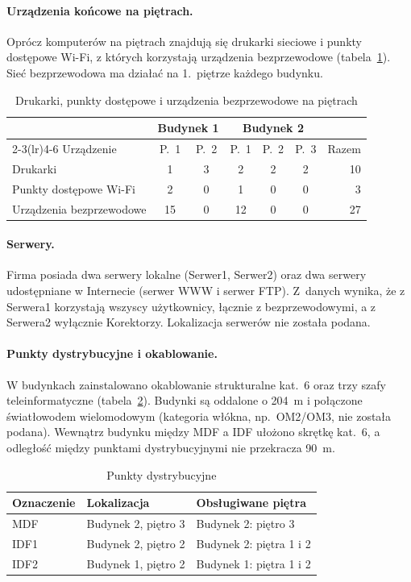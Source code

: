 \documentclass[12pt,a4paper]{article}
\begin{document}
\paragraph{Urządzenia końcowe na piętrach.} Oprócz komputerów na piętrach
znajdują się drukarki sieciowe i punkty dostępowe Wi-Fi, z których korzystają
urządzenia bezprzewodowe (tabela~\ref{tab:sprzet}). Sieć bezprzewodowa ma
działać na 1.~piętrze każdego budynku.

\begin{table}[htbp]
\centering
\caption{Drukarki, punkty dostępowe i urządzenia bezprzewodowe na piętrach}
\label{tab:sprzet}
\begin{tabular}{lcccccr}
\toprule
 & \multicolumn{2}{c}{Budynek 1} & \multicolumn{3}{c}{Budynek 2} & \\
\cmidrule(lr){2-3}\cmidrule(lr){4-6}
Urządzenie & P.~1 & P.~2 & P.~1 & P.~2 & P.~3 & Razem \\
\midrule
Drukarki                    &  1 & 3 &  2 & 2 & 2 & 10 \\
Punkty dostępowe Wi-Fi      &  2 & 0 &  1 & 0 & 0 &  3 \\
Urządzenia bezprzewodowe    & 15 & 0 & 12 & 0 & 0 & 27 \\
\bottomrule
\end{tabular}
\end{table}

\paragraph{Serwery.} Firma posiada dwa serwery lokalne (Serwer1, Serwer2)
oraz dwa serwery udostępniane w Internecie (serwer WWW i serwer FTP). Z~danych
wynika, że z Serwera1 korzystają wszyscy użytkownicy, łącznie z bezprzewodowymi,
a z Serwera2 wyłącznie Korektorzy. Lokalizacja serwerów nie została podana.

\paragraph{Punkty dystrybucyjne i okablowanie.} W budynkach zainstalowano
okablowanie strukturalne kat.~6 oraz trzy szafy teleinformatyczne
(tabela~\ref{tab:pd}). Budynki są oddalone o 204~m i połączone światłowodem
wielomodowym (kategoria włókna, np.\ OM2/OM3, nie została podana). Wewnątrz
budynku między MDF a IDF ułożono skrętkę kat.~6, a odległość między
punktami dystrybucyjnymi nie przekracza 90~m.

\begin{table}[htbp]
\centering
\caption{Punkty dystrybucyjne}
\label{tab:pd}
\begin{tabular}{lll}
\toprule
Oznaczenie & Lokalizacja & Obsługiwane piętra \\
\midrule
MDF  & Budynek 2, piętro 3 & Budynek 2: piętro 3 \\
IDF1 & Budynek 2, piętro 2 & Budynek 2: piętra 1 i 2 \\
IDF2 & Budynek 1, piętro 2 & Budynek 1: piętra 1 i 2 \\
\bottomrule
\end{tabular}
\end{table}
\end{document}
